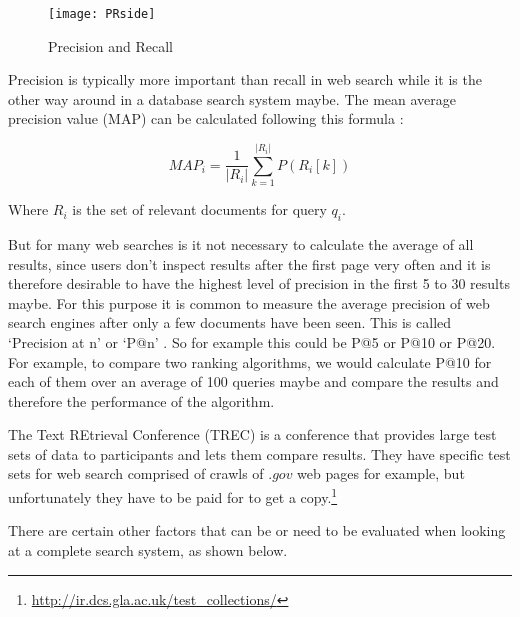 %   

\begin{figure}[htbp]
  \centering
  \texttt{[image: PRside]}
  \caption[Precision and Recall]{Precision and Recall\footnotemark}
\label{fig:PR}
\end{figure}

Precision is typically more important than recall in web search while it is the other way around in a database search system maybe. The mean average precision value (MAP) can be calculated following this formula \autocite[p.141]{Baeza-Yates2011}:

\begin{equation}
  MAP_i = \frac{1}{|R_i|} \sum_{k=1}^{|R_i|} P(R_i[k])
\label{eq:MAP}
\end{equation}

Where $R_i$ is the set of relevant documents for query $q_i$.

But for many web searches is it not necessary to calculate the average of all results, since users don't inspect results after the first page very often and it is therefore desirable to have the highest level of precision in the first 5 to 30 results maybe. For this purpose it is common to measure the average precision of web search engines after only a few documents have been seen. This is called `Precision at n' or `P@n' \autocite[p.140]{Baeza-Yates2011}. So for example this could be P@5 or P@10 or P@20. For example, to compare two ranking algorithms, we would calculate P@10 for each of them over an average of 100 queries maybe and compare the results and therefore the performance of the algorithm.

The Text REtrieval Conference (TREC) is a conference that provides large test sets of data to participants and lets them compare results. They have specific test sets for web search comprised of crawls of $.gov$ web pages for example, but unfortunately they have to be paid for to get a copy.\footnote{\url{http://ir.dcs.gla.ac.uk/test_collections/}}%

There are certain other factors that can be or need to be evaluated when looking at a complete search system, as shown below.

